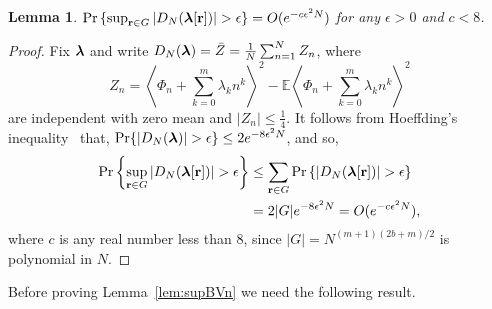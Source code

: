 \documentclass[aap]{imsart}
\newcommand{\prob}{\operatorname{Pr}}
\newcommand{\expect}{{\mathbb E}}
\newcommand{\fracpart}[1]{\left\langle #1 \right\rangle}
\newcommand{\abs}[1]{\left\vert #1 \right\vert}
\newcommand{\sabs}[1]{\vert #1 \vert}
\newtheorem{lemma}{Lemma}
\newcommand{\cubr}[1]{{\left\{ #1 \right\}}}
\newcommand{\scubr}[1]{{\{ #1 \}}}
\begin{document}


\begin{lemma}\label{lem:supVjk}
$\prob\cubr{   \sup_{\rbf \in G}\abs{ D_N(\lambdabf[\rbf])  } > \epsilon } = O(e^{-c \epsilon^2 N})$ for any $\epsilon > 0$ and $c < 8$.
\end{lemma}
 \begin{proof}
Fix $\boldsymbol{\lambda}$ and write $D_N(\boldsymbol{\lambda}) = \bar{Z} = \frac{1}{N}  \sum_{n=1}^{N}Z_{n}$, where
 \[
 Z_{n}=\fracpart{  \Phi_n+\sum_{k = 0}^{m}{\lambda_k n^k} }^{2} - \expect \fracpart{  \Phi_n + \sum_{k = 0}^{m}{\lambda_k n^k} }^{2}
 \]
 are independent with zero mean and $\abs{Z_n} \leq \tfrac{1}{4}$. It follows from Hoeffding's inequality~\cite{Hoeffding_inequality_1963} that,  $\prob\{ \abs{D_N(\lambdabf)} > \epsilon \} \leq 2e^{ - 8 \epsilon^2 N}$, and so,
 \begin{align*}
 \prob\cubr{  \sup_{\rbf\in G}\left\vert D_N(\lambdabf[\rbf]) \right\vert >\epsilon }  &\leq \sum_{\rbf \in G} \prob\scubr{  \left\vert D_N(\lambdabf[\rbf])  \right\vert >\epsilon } \nonumber \\
&= 2 |G| e^{ - 8 \epsilon^2 N} = O(e^{-c \epsilon^2 N}), \label{eq:betaprobconv}
\end{align*}
where $c$ is any real number less than $8$, since $|G| = N^{(m+1)(2b + m)/2}$ is polynomial in $N$.
\end{proof}

Before proving Lemma~\ref{lem:supBVn} we need the following result.
\end{document}
